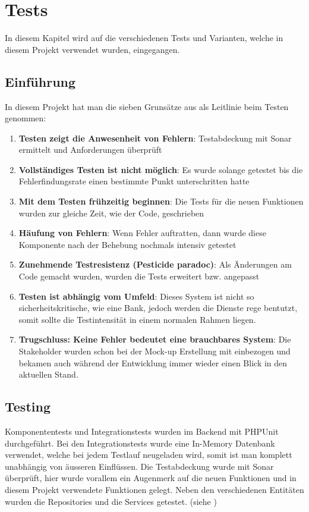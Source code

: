 %
%

\chapter{Tests}\label{chap.tests} 
In diesem Kapitel wird auf die verschiedenen Tests und Varianten, welche in diesem Projekt verwendet wurden, eingegangen.

\section{Einführung}
In diesem Projekt hat man die sieben Grunsätze aus \cite{test_soft_book} als Leitlinie beim Testen genommen:
\begin{enumerate}
\item \textbf{Testen zeigt die Anwesenheit von Fehlern}: Testabdeckung mit Sonar ermittelt und Anforderungen überprüft
\item \textbf{Vollständiges Testen ist nicht möglich}: Es wurde solange getestet bis die Fehlerfindungsrate einen bestimmte Punkt unterschritten hatte
\item \textbf{Mit dem Testen frühzeitig beginnen}: Die Tests für die neuen Funktionen wurden zur gleiche Zeit, wie der Code, geschrieben
\item \textbf{Häufung von Fehlern}: Wenn Fehler auftratten, dann wurde diese Komponente nach der Behebung nochmals intensiv getestet
\item \textbf{Zunehmende Testresistenz (Pesticide paradoc)}: Als Änderungen am Code gemacht wurden, wurden die Tests erweitert bzw. angepasst
\item \textbf{Testen ist abhängig vom Umfeld}: Dieses System ist nicht so sicherheitskritische, wie eine Bank, jedoch werden die Dienste rege bentutzt, somit sollte die Testintensität in einem normalen Rahmen liegen.
\item \textbf{Trugschluss: Keine Fehler bedeutet eine brauchbares System}: Die Stakeholder wurden schon bei der Mock-up Erstellung mit einbezogen und bekamen auch während der Entwicklung immer wieder einen Blick in den aktuellen Stand.
\end{enumerate}

\section{Testing}
Komponententests und Integrationstests wurden im Backend mit PHPUnit durchgeführt. Bei den Integrationstests wurde eine In-Memory Datenbank verwendet, welche bei jedem Testlauf neugeladen wird, somit ist man komplett unabhängig von äusseren Einflüssen. Die Testabdeckung wurde mit Sonar überprüft, hier wurde vorallem ein Augenmerk auf die neuen Funktionen und in diesem Projekt verwendete Funktionen gelegt. Neben den verschiedenen Entitäten wurden die Repositories und die Services getestet. (siehe \cite{test_soft_book})

